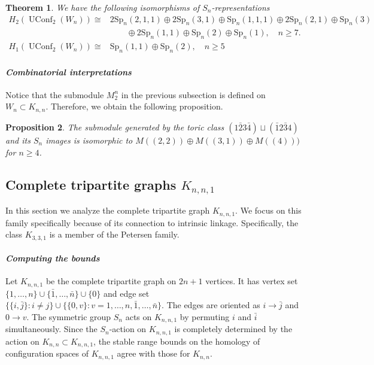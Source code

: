 \documentclass[12pt]{amsart}
\newtheorem{thm}{Theorem}[section]
\newtheorem{prop}[thm]{Proposition}
\theoremstyle{definition}
\newcommand{\uconf}{\operatorname{UConf}}
\begin{document}
\begin{thm}
We have the following isomorphisms of $S_n$-representations
\begin{align*}
H_2(\uconf_2(W_n)) \cong & 2\mathrm{Sp}_n(2,1,1) \oplus 2\mathrm{Sp}_n(3,1) \oplus \mathrm{Sp}_n(1,1,1) \oplus 2\mathrm{Sp}_n(2,1)\oplus \mathrm{Sp}_n(3) \\
& \qquad \oplus 2\mathrm{Sp}_n(1,1) \oplus \mathrm{Sp}_n(2)\oplus \mathrm{Sp}_n(1),\quad n\geq 7.
\\
H_1(\uconf_2(W_n))\cong & \mathrm{Sp}_n(1, 1) \oplus \mathrm{Sp}_n(2),\quad n\geq 5
\end{align*}
\end{thm}

\paragraph{\textit{Combinatorial interpretations}} Notice that the submodule $M_2^n$ in the previous subsection is defined on $W_n\subset K_{n,n}$. Therefore, we obtain the following proposition.

\begin{prop}
The submodule generated by the toric class $(1\bar23\bar4)\sqcup (\bar12\bar34)$ and its $S_n$ images is isomorphic to $M((2,2))\oplus M((3,1))\oplus M((4)))$ for $n\geq 4$.
\end{prop}

\subsection{Complete tripartite graphs $K_{n,n,1}$}

In this section we analyze the complete tripartite graph $K_{n,n,1}$. We focus on this family specifically because of its connection to intrinsic linkage. Specifically, the class $K_{3,3,1}$ is a member of the Petersen family.

\paragraph{\textit{Computing the bounds}}
Let $K_{n,n,1}$ be the complete tripartite graph on $2n+1$ vertices. It has vertex set $\{1,\dots,n\}\cup \{\bar{1},\dots,\bar{n}\}\cup\{0\}$ and edge set $\{\{i,\bar{j}\}: i\neq j\}\cup \{\{0,v\}:v=1,\dots,n,\bar1,\dots,\bar n\}$. The edges are oriented as $i\to\bar j$ and $0\to v$. The symmetric group $S_n$ acts on $K_{n,n,1}$ by permuting $i$ and $\bar i$ simultaneously. Since the $S_n$-action on $K_{n,n,1}$ is completely determined by the action on $K_{n,n}\subset K_{n,n,1}$, the stable range bounds on the homology of configuration spaces of $K_{n,n,1}$ agree with those for $K_{n,n}$.
\end{document}
